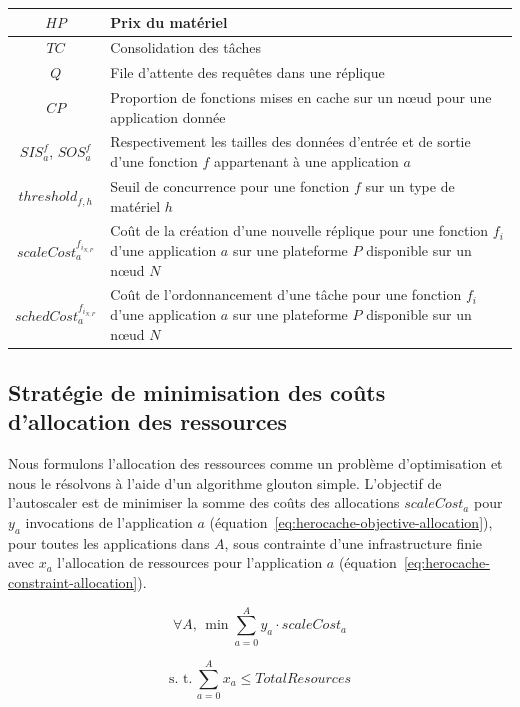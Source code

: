 \begin{table}[t]
\begin{center}
{\begin{tabularx}{\linewidth}{|c|Y|}
    $HP$ & Prix du matériel \\ \hline
    $TC$ & Consolidation des tâches \\ \hline
    $Q$ & File d'attente des requêtes dans une réplique \\ \hline
    $CP$ & Proportion de fonctions mises en cache sur un nœud pour une application donnée \\ \hline
    $SIS^{f}_{a}$, $SOS^{f}_{a}$ & Respectivement les tailles des données d'entrée et de sortie d'une fonction $f$ appartenant à une application $a$ \\ \hline
    $threshold_{f, h}$ & Seuil de concurrence pour une fonction $f$ sur un type de matériel $h$ \\ \hline
    $scaleCost^{{f}_{{i}_{N, P}}}_a$ & Coût de la création d'une nouvelle réplique pour une fonction $f_i$ d'une application $a$ sur une plateforme $P$ disponible sur un nœud $N$ \\ \hline
    $schedCost^{{f}_{{i}_{N, P}}}_a$ & Coût de l'ordonnancement d'une tâche pour une fonction $f_i$ d'une application $a$ sur une plateforme $P$ disponible sur un nœud $N$ \\ \hline
    \end{tabularx}}
    \label{table:herocache-notation}
    \end{center}
\end{table}

\subsection{Stratégie de minimisation des coûts d'allocation des ressources}

Nous formulons l'allocation des ressources comme un problème d'optimisation et nous le résolvons à l'aide d'un algorithme glouton simple. L'objectif de l'autoscaler est de minimiser la somme des coûts des allocations $scaleCost_{a}$ pour $y_a$ invocations de l'application $a$ (équation~\ref{eq:herocache-objective-allocation}), pour toutes les applications dans $A$, sous contrainte d'une infrastructure finie avec $x_a$ l'allocation de ressources pour l'application $a$ (équation~\ref{eq:herocache-constraint-allocation}).

\begin{equation}
    \forall A, \, \min \sum_{a = 0}^{A} y_a \cdot scaleCost_{a}
\label{eq:herocache-objective-allocation}
\end{equation}

\begin{equation}
    \text{s. t.} \, \sum_{a = 0}^{A} x_a \leq Total Resources
\label{eq:herocache-constraint-allocation}
\end{equation}

